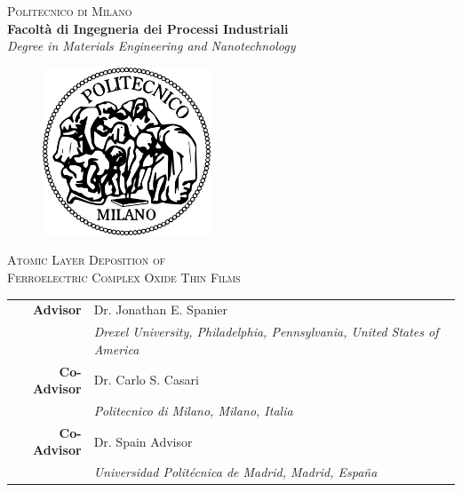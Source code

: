 \thispagestyle{empty}
\begin{titlepage}
\vspace*{-2.5cm}
\begin{center}
  {\LARGE
  \textsc{Politecnico di Milano}\\
  \textbf{\Large
  Facolt\`a di Ingegneria dei Processi Industriali}\\
  \emph{\large Degree in Materials Engineering and Nanotechnology}}\\
  \vspace*{1truecm}
  \begin{figure}[htbp]
    \begin{center}
      \includegraphics[width=5cm]{./pictures/logopm.png}
    \end{center}
  \end{figure}
  \vspace*{0.3cm}
  
   {\huge\textsc{
  Atomic Layer Deposition of \\
  Ferroelectric Complex Oxide Thin Films\\
  }}

  
  
\end{center}
\vspace*{1.0cm} \large
\begin{flushleft}

\begin{tabular*}{0.75\textwidth}{>{\bfseries}r l}
  Advisor & Dr. Jonathan E. Spanier \\
  & \emph{\small Drexel University, Philadelphia, Pennsylvania, United States of America}\\
  Co-Advisor  & Dr. Carlo S. Casari \\
  & \emph{\small Politecnico di Milano, Milano, Italia}\\
  Co-Advisor  & Dr. Spain Advisor \\
  & \emph{\small Universidad Polit\'ecnica de Madrid, Madrid, Espa\~na}\\
\end{tabular*}



\end{flushleft}
\end{titlepage}
